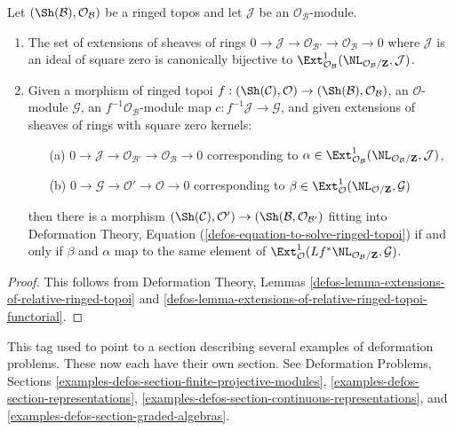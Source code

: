 \begin{lemma}
\label{lemma-extensions-of-ringed-topoi}
Let $(\Sh(\mathcal{B}), \mathcal{O}_\mathcal{B})$ be a ringed topos
and let $\mathcal{J}$ be an $\mathcal{O}_\mathcal{B}$-module.
\begin{enumerate}
\item The set of extensions of sheaves of rings
$0 \to \mathcal{J} \to \mathcal{O}_{\mathcal{B}'} \to
\mathcal{O}_\mathcal{B} \to 0$
where $\mathcal{J}$ is an ideal of square zero is canonically bijective to
$\Ext^1_{\mathcal{O}_\mathcal{B}}(
\NL_{\mathcal{O}_\mathcal{B}/\mathbf{Z}}, \mathcal{J})$.
\item Given a morphism of ringed topoi
$f : (\Sh(\mathcal{C}), \mathcal{O}) \to
(\Sh(\mathcal{B}), \mathcal{O}_\mathcal{B})$, an $\mathcal{O}$-module
$\mathcal{G}$, an $f^{-1}\mathcal{O}_\mathcal{B}$-module map
$c : f^{-1}\mathcal{J} \to \mathcal{G}$, and
given extensions of sheaves of rings with square zero kernels:
\begin{enumerate}
\item[(a)] $0 \to \mathcal{J} \to \mathcal{O}_{\mathcal{B}'} \to
\mathcal{O}_\mathcal{B} \to 0$ corresponding to
$\alpha \in \Ext^1_{\mathcal{O}_\mathcal{B}}(
\NL_{\mathcal{O}_\mathcal{B}/\mathbf{Z}}, \mathcal{J})$,
\item[(b)] $0 \to \mathcal{G} \to \mathcal{O}' \to \mathcal{O} \to 0$
corresponding to
$\beta \in \Ext^1_\mathcal{O}(\NL_{\mathcal{O}/\mathbf{Z}}, \mathcal{G})$
\end{enumerate}
then there is a morphism $(\Sh(\mathcal{C}), \mathcal{O}') \to
(\Sh(\mathcal{B}, \mathcal{O}_{\mathcal{B}'})$ fitting into
Deformation Theory, Equation (\ref{defos-equation-to-solve-ringed-topoi})
if and only if $\beta$ and $\alpha$ map to the same element of
$\Ext^1_\mathcal{O}(
Lf^*\NL_{\mathcal{O}_\mathcal{B}/\mathbf{Z}}, \mathcal{G})$.
\end{enumerate}
\end{lemma}

\begin{proof}
This follows from Deformation Theory, Lemmas
\ref{defos-lemma-extensions-of-relative-ringed-topoi} and
\ref{defos-lemma-extensions-of-relative-ringed-topoi-functorial}.
\end{proof}

\begin{remark}
\label{remark-examples-formal-defos}
This tag used to point to a section describing several examples
of deformation problems. These now each have their own section.
See Deformation Problems, Sections
\ref{examples-defos-section-finite-projective-modules},
\ref{examples-defos-section-representations},
\ref{examples-defos-section-continuous-representations}, and
\ref{examples-defos-section-graded-algebras}.
\end{remark}


